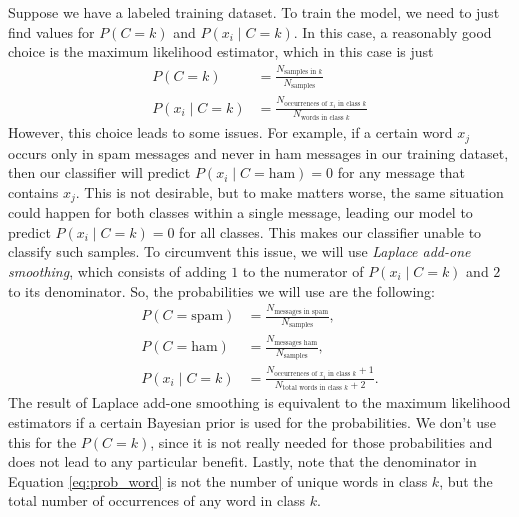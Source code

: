 Suppose we have a labeled training dataset.
To train the model, we need to just find values for $P(C=k)$ and $P(x_i \mid C=k)$.
In this case, a reasonably good choice is the maximum likelihood estimator, which in this case is just
\begin{align*}
P(C=k) &=\frac{N_{\text{samples in $k$}}}{N_{\text{samples}}}
\\
P(x_i \mid C=k) &= \frac{N_{\text{occurrences of $x_i$ in class $k$}}}{N_{\text{words in class $k$}}}
\end{align*}
However, this choice leads to some issues.
For example, if a certain word $x_j$ occurs only in spam messages and never in ham messages in our training dataset, then our classifier will predict $P(x_i \mid C=\text{ham})=0$ for any message that contains $x_j$.
This is not desirable, but to make matters worse, the same situation could happen for both classes within a single message, leading our model to predict
$P(x_i \mid C=k)=0$ for all classes.
This makes our classifier unable to classify such samples.
To circumvent this issue, we will use \emph{Laplace add-one smoothing}, which consists of adding $1$ to the numerator of $P(x_i \mid C=k)$ and $2$ to its denominator.
So, the probabilities we will use are the following:
\begin{align}
\label{eq:prob_spam}
    P(C=\text{spam}) &= \frac{N_{\text{messages in spam}}}{N_{\text{samples}}},
    \\
    P(C=\text{ham}) &= \frac{N_{\text{messages ham}}}{N_{\text{samples}}},
    \label{eq:prob_ham}
\\
    P(x_i \mid C=k) &= \frac{N_{\text{occurrences of $x_i$ in class $k$}}+1}{N_{\text{total words in class $k$}}+2}.
\label{eq:prob_word}
\end{align}
The result of Laplace add-one smoothing is equivalent to the maximum likelihood estimators if a certain Bayesian prior is used for the probabilities.
We don't use this for the $P(C=k)$, since it is not really needed for those probabilities and does not lead to any particular benefit.
Lastly, note that the denominator in Equation \ref{eq:prob_word} is not the number of unique words in class $k$, but the total number of occurrences of any word in class $k$.

